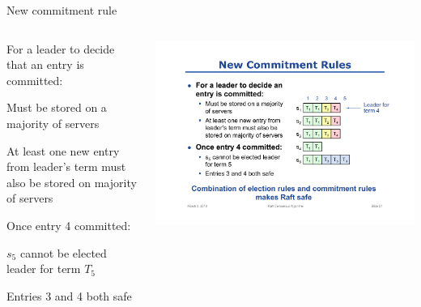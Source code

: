 \begin{frame}{New commitment rule}
\begin{columns}[T]
\begin{column}{0.5\textwidth}
\BIL
\item  \alert{For a leader to decide that an entry is committed}:
	\BI
	\item Must be stored on a majority of servers
	\item At least one new entry from leader's term must also be stored on 
			majority of servers
	\EI
\item \alert{Once entry 4 committed}:
	\BI
	\item $s_5$ cannot be elected leader for term $T_5$
	\item Entries 3 and 4 both safe
	\EI
\EIL
\end{column}
\begin{column}{0.5\textwidth}
\includegraphics[width=\textwidth]{new-commit}
\end{column}
\end{columns}

\bigskip\bigskip
{}

\end{frame}

